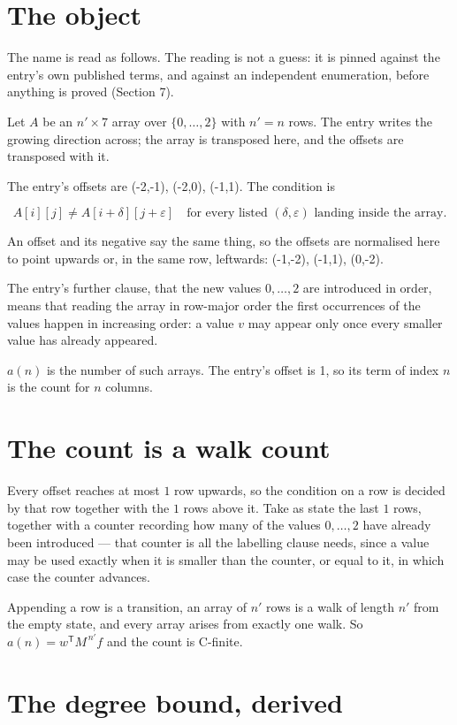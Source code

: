 \documentclass[11pt]{article}
\theoremstyle{definition}
\begin{document}
\section{The object}

The name is read as follows. The reading is not a guess: it is pinned against the entry's own published terms, and against an independent enumeration, before anything is proved (Section 7).

Let $A$ be an $n' \times 7$ array over $\{0,\dots,2\}$ with $n' = n$ rows. The entry writes the growing direction across; the array is transposed here, and the offsets are transposed with it.

The entry's offsets are (-2,-1), (-2,0), (-1,1). The condition is

\[A[i][j] \ne A[i{+}\delta][j{+}\varepsilon]\quad\text{for every listed }(\delta,\varepsilon)\text{ landing inside the array.}\]

An offset and its negative say the same thing, so the offsets are normalised here to point upwards or, in the same row, leftwards: (-1,-2), (-1,1), (0,-2).

The entry's further clause, that the new values $0,\dots,2$ are introduced in order, means that reading the array in row-major order the first occurrences of the values happen in increasing order: a value $v$ may appear only once every smaller value has already appeared.

$a(n)$ is the number of such arrays. The entry's offset is 1, so its term of index $n$ is the count for $n$ columns.

\section{The count is a walk count}

Every offset reaches at most $1$ row upwards, so the condition on a row is decided by that row together with the $1$ rows above it. Take as state the last $1$ rows, together with a counter recording how many of the values $0,\dots,2$ have already been introduced --- that counter is all the labelling clause needs, since a value may be used exactly when it is smaller than the counter, or equal to it, in which case the counter advances.

Appending a row is a transition, an array of $n'$ rows is a walk of length $n'$ from the empty state, and every array arises from exactly one walk. So $a(n) = w^{\mathsf T}M^{\,n'}f$ and the count is C-finite.

\section{The degree bound, derived}
\end{document}
